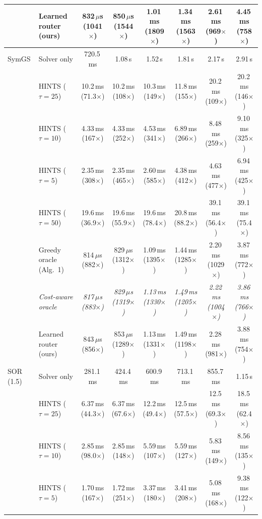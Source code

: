 {\begin{tabular}{llcccccc}
 & Learned router (ours) & 832\,$\mu$s (1041$\times$) & 850\,$\mu$s (1544$\times$) & 1.01\,ms (1809$\times$) & 1.34\,ms (1563$\times$) & 2.61\,ms (969$\times$) & 4.45\,ms (758$\times$) \\
\midrule
SymGS & Solver only & 720.5\,ms & 1.08\,s & 1.52\,s & 1.81\,s & 2.17\,s & 2.91\,s \\
 & HINTS ($\tau{=}25$) & 10.2\,ms (71.3$\times$) & 10.2\,ms (108$\times$) & 10.3\,ms (149$\times$) & 11.8\,ms (155$\times$) & 20.2\,ms (109$\times$) & 20.2\,ms (146$\times$) \\
 & HINTS ($\tau{=}10$) & 4.33\,ms (167$\times$) & 4.33\,ms (252$\times$) & 4.53\,ms (341$\times$) & 6.89\,ms (266$\times$) & 8.48\,ms (259$\times$) & 9.10\,ms (325$\times$) \\
 & HINTS ($\tau{=}5$) & 2.35\,ms (308$\times$) & 2.35\,ms (465$\times$) & 2.60\,ms (585$\times$) & 4.38\,ms (412$\times$) & 4.63\,ms (477$\times$) & 6.94\,ms (425$\times$) \\
 & HINTS ($\tau{=}50$) & 19.6\,ms (36.9$\times$) & 19.6\,ms (55.9$\times$) & 19.6\,ms (78.4$\times$) & 20.8\,ms (88.2$\times$) & 39.1\,ms (56.4$\times$) & 39.1\,ms (75.4$\times$) \\
 & Greedy oracle (Alg.~1) & 814\,$\mu$s (882$\times$) & 829\,$\mu$s (1312$\times$) & 1.09\,ms (1395$\times$) & 1.44\,ms (1285$\times$) & 2.20\,ms (1029$\times$) & 3.87\,ms (772$\times$) \\
 & \textit{Cost-aware oracle} & \textit{817\,$\mu$s (883$\times$)} & \textit{829\,$\mu$s (1319$\times$)} & \textit{1.13\,ms (1330$\times$)} & \textit{1.49\,ms (1205$\times$)} & \textit{2.22\,ms (1004$\times$)} & \textit{3.86\,ms (766$\times$)} \\
 & Learned router (ours) & 843\,$\mu$s (856$\times$) & 853\,$\mu$s (1289$\times$) & 1.13\,ms (1331$\times$) & 1.49\,ms (1198$\times$) & 2.28\,ms (981$\times$) & 3.88\,ms (754$\times$) \\
\midrule
SOR (1.5) & Solver only & 281.1\,ms & 424.4\,ms & 600.9\,ms & 713.1\,ms & 855.7\,ms & 1.15\,s \\
 & HINTS ($\tau{=}25$) & 6.37\,ms (44.3$\times$) & 6.37\,ms (67.6$\times$) & 12.2\,ms (49.4$\times$) & 12.5\,ms (57.5$\times$) & 12.5\,ms (69.3$\times$) & 18.5\,ms (62.4$\times$) \\
 & HINTS ($\tau{=}10$) & 2.85\,ms (98.0$\times$) & 2.85\,ms (148$\times$) & 5.59\,ms (107$\times$) & 5.59\,ms (127$\times$) & 5.83\,ms (149$\times$) & 8.56\,ms (135$\times$) \\
 & HINTS ($\tau{=}5$) & 1.70\,ms (167$\times$) & 1.72\,ms (251$\times$) & 3.37\,ms (180$\times$) & 3.41\,ms (208$\times$) & 5.08\,ms (168$\times$) & 9.38\,ms (122$\times$) \\

\end{tabular}}

